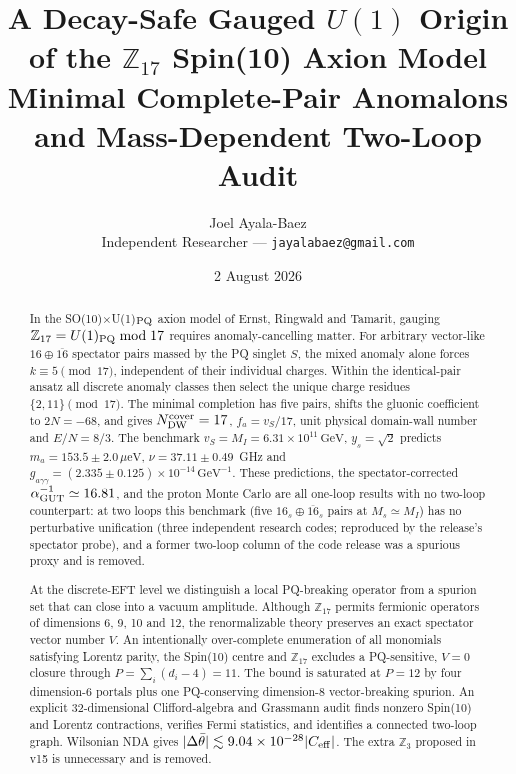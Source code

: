 \documentclass[11pt,a4paper]{article}
\title{\bf A Decay-Safe Gauged $U(1)$ Origin of the $\mathbb{Z}_{17}$
Spin(10) Axion Model\\ \large Minimal Complete-Pair Anomalons and Mass-Dependent
Two-Loop Audit}
\author{Joel Ayala-Baez\\
\small Independent Researcher --- \texttt{jayalabaez@gmail.com}}
\date{2 August 2026}
\newcommand{\ueV}{\,\mu\mathrm{eV}}
\newcommand{\GeV}{\,\mathrm{GeV}}
\newcommand{\fa}{f_a}
\newcommand{\ma}{m_a}
\newcommand{\Zs}{\mathbb{Z}_{17}}
\begin{document}
\maketitle

\begin{abstract}
\sloppy
In the SO(10)$\times$U(1)$_{\rm PQ}$ axion model of Ernst, Ringwald and
Tamarit, gauging $\Zs=U(1)_{\rm PQ}\bmod17$ requires anomaly-cancelling
matter. For arbitrary vector-like $16\oplus\overline{16}$ spectator
pairs massed by the PQ singlet $S$, the mixed anomaly alone forces
$k\equiv5\pmod{17}$, independent of their individual charges. Within
the identical-pair ansatz all discrete anomaly classes then select the
unique charge residues $\{2,11\}\pmod{17}$. The minimal completion has
five pairs, shifts the
gluonic coefficient to $2N=-68$, and gives
$N_{\rm DW}^{\rm cover}=17$, $\fa=v_S/17$, unit physical domain-wall
number and $E/N=8/3$. The benchmark $v_S=M_I=6.31\times10^{11}\GeV$,
$y_s=\sqrt2$ predicts $\ma=153.5\pm2.0\ueV$,
$\nu=37.11\pm0.49$~GHz and
$g_{a\gamma\gamma}=(2.335\pm0.125)\times10^{-14}\GeV^{-1}$.
These predictions, the spectator-corrected $\alpha_{\rm GUT}^{-1}\simeq16.81$,
and the proton Monte Carlo are all one-loop results with no two-loop
counterpart: at two loops this benchmark (five
$16_s\oplus\overline{16}_s$ pairs at $M_s\simeq M_I$) has no perturbative
unification (three independent research codes; reproduced by the
release's spectator probe), and a former two-loop column of
the code release was a spurious proxy and is removed.

At the discrete-EFT level we distinguish a local
PQ-breaking operator from a spurion set that can close into a vacuum
amplitude. Although $\Zs$ permits fermionic operators of dimensions 6, 9,
10 and 12, the renormalizable theory preserves an
exact spectator vector number $V$. An intentionally over-complete
enumeration of all monomials satisfying Lorentz parity, the Spin(10)
centre and $\Zs$ excludes a PQ-sensitive, $V=0$ closure through
$P=\sum_i(d_i-4)=11$. The bound is saturated at $P=12$ by four
dimension-6 portals plus one PQ-conserving dimension-8 vector-breaking
spurion. An explicit 32-dimensional Clifford-algebra and Grassmann audit
finds nonzero Spin(10) and Lorentz contractions, verifies Fermi statistics,
and identifies a connected two-loop graph. Wilsonian NDA gives
$|\Delta\bar\theta|\lesssim9.04\times10^{-28}|C_{\rm eff}|$. The extra
$\mathbb Z_3$ proposed in v15 is unnecessary and is removed.


\end{abstract}
\end{document}
